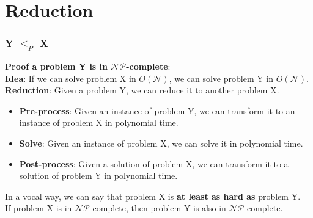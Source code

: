 \documentclass[t]{beamer}
\begin{document}
    \section{Reduction}
        \begin{frame}
            \frametitle{Y $\leq_P$ X}
             \textbf{Proof a problem Y is in $\mathcal{NP}$-complete}:\\
             \textbf{Idea}: If we can solve problem X in $O(\mathcal{N})$, we can solve problem Y in $O(\mathcal{N})$.\\
             \textbf{Reduction}: Given a problem Y, we can reduce it to another problem X.\\
            \begin{itemize}
                \item<4-> \textbf{Pre-process}: Given an instance of problem Y, we can transform it to an instance of problem X in polynomial time.
                \item<5-> \textbf{Solve}: Given an instance of problem X, we can solve it in polynomial time.
                \item<6-> \textbf{Post-process}: Given a solution of problem X, we can transform it to a solution of problem Y in polynomial time.
            \end{itemize}
            \bigskip
             In a vocal way, we can say that problem X is \textbf{at least as hard as} problem Y.\\
            \bigskip
             If problem X is in $\mathcal{NP}$-complete, then problem Y is also in $\mathcal{NP}$-complete.\\
        \end{frame}

\end{document}
